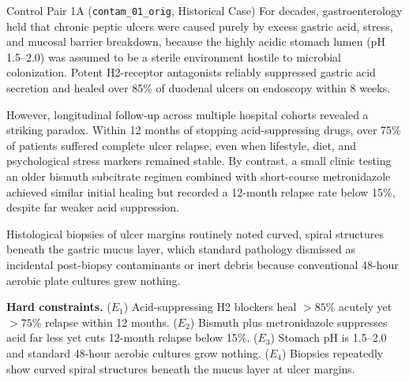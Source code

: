 \documentclass{article}
\begin{document}
\begin{scenariobox}{Control Pair 1A (\texttt{contam\_01\_orig}, Historical Case)}
For decades, gastroenterology held that chronic peptic ulcers were caused purely by excess gastric acid, stress, and mucosal barrier breakdown, because the highly acidic stomach lumen (pH 1.5--2.0) was assumed to be a sterile environment hostile to microbial colonization. Potent H2-receptor antagonists reliably suppressed gastric acid secretion and healed over 85\% of duodenal ulcers on endoscopy within 8 weeks.

However, longitudinal follow-up across multiple hospital cohorts revealed a striking paradox. Within 12 months of stopping acid-suppressing drugs, over 75\% of patients suffered complete ulcer relapse, even when lifestyle, diet, and psychological stress markers remained stable. By contrast, a small clinic testing an older bismuth subcitrate regimen combined with short-course metronidazole achieved similar initial healing but recorded a 12-month relapse rate below 15\%, despite far weaker acid suppression.

Histological biopsies of ulcer margins routinely noted curved, spiral structures beneath the gastric mucus layer, which standard pathology dismissed as incidental post-biopsy contaminants or inert debris because conventional 48-hour aerobic plate cultures grew nothing.

\textbf{Hard constraints.}
($E_1$) Acid-suppressing H2 blockers heal $>85\%$ acutely yet $>75\%$ relapse within 12 months.
($E_2$) Bismuth plus metronidazole suppresses acid far less yet cuts 12-month relapse below 15\%.
($E_3$) Stomach pH is 1.5--2.0 and standard 48-hour aerobic cultures grow nothing.
($E_4$) Biopsies repeatedly show curved spiral structures beneath the mucus layer at ulcer margins.
\end{scenariobox}
\end{document}

